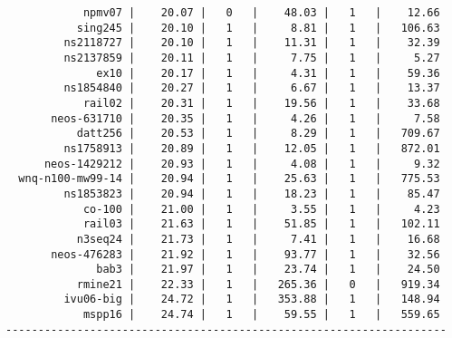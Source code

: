 \begin{lstlisting}
            npmv07 |    20.07 |   0   |    48.03 |   1   |    12.66
           sing245 |    20.10 |   1   |     8.81 |   1   |   106.63
         ns2118727 |    20.10 |   1   |    11.31 |   1   |    32.39
         ns2137859 |    20.11 |   1   |     7.75 |   1   |     5.27
              ex10 |    20.17 |   1   |     4.31 |   1   |    59.36
         ns1854840 |    20.27 |   1   |     6.67 |   1   |    13.37
            rail02 |    20.31 |   1   |    19.56 |   1   |    33.68
       neos-631710 |    20.35 |   1   |     4.26 |   1   |     7.58
           datt256 |    20.53 |   1   |     8.29 |   1   |   709.67
         ns1758913 |    20.89 |   1   |    12.05 |   1   |   872.01
      neos-1429212 |    20.93 |   1   |     4.08 |   1   |     9.32
  wnq-n100-mw99-14 |    20.94 |   1   |    25.63 |   1   |   775.53
         ns1853823 |    20.94 |   1   |    18.23 |   1   |    85.47
            co-100 |    21.00 |   1   |     3.55 |   1   |     4.23
            rail03 |    21.63 |   1   |    51.85 |   1   |   102.11
           n3seq24 |    21.73 |   1   |     7.41 |   1   |    16.68
       neos-476283 |    21.92 |   1   |    93.77 |   1   |    32.56
              bab3 |    21.97 |   1   |    23.74 |   1   |    24.50
           rmine21 |    22.33 |   1   |   265.36 |   0   |   919.34
         ivu06-big |    24.72 |   1   |   353.88 |   1   |   148.94
            mspp16 |    24.74 |   1   |    59.55 |   1   |   559.65
--------------------------------------------------------------------
\end{lstlisting}
    